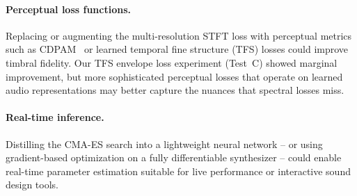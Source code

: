 \paragraph{Perceptual loss functions.}
Replacing or augmenting the multi-resolution STFT loss with perceptual metrics such as CDPAM~\cite{manocha2021cdpam} or learned temporal fine structure (TFS) losses could improve timbral fidelity.
Our TFS envelope loss experiment (Test~C) showed marginal improvement, but more sophisticated perceptual losses that operate on learned audio representations may better capture the nuances that spectral losses miss.

\paragraph{Real-time inference.}
Distilling the CMA-ES search into a lightweight neural network -- or using gradient-based optimization on a fully differentiable synthesizer -- could enable real-time parameter estimation suitable for live performance or interactive sound design tools.
